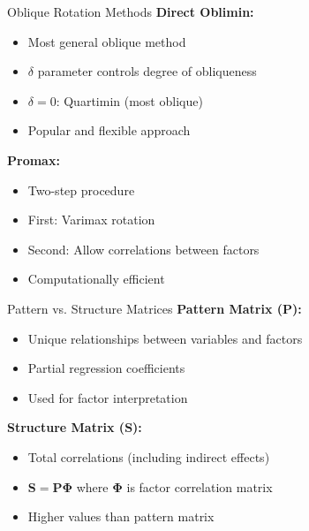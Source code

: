 \documentclass[aspectratio=169]{beamer}
\begin{document}
\begin{frame}{Oblique Rotation Methods}
  \textbf{Direct Oblimin:}
  \begin{itemize}
    \item Most general oblique method
    \item $\delta$ parameter controls degree of obliqueness
    \item $\delta = 0$: Quartimin (most oblique)
    \item Popular and flexible approach
  \end{itemize}
  
  \textbf{Promax:}
  \begin{itemize}
    \item Two-step procedure
    \item First: Varimax rotation
    \item Second: Allow correlations between factors
    \item Computationally efficient
  \end{itemize}
\end{frame}

\begin{frame}{Pattern vs. Structure Matrices}
  \textbf{Pattern Matrix ($\mathbf{P}$):}
  \begin{itemize}
    \item Unique relationships between variables and factors
    \item Partial regression coefficients
    \item Used for factor interpretation
  \end{itemize}
  
  \textbf{Structure Matrix ($\mathbf{S}$):}
  \begin{itemize}
    \item Total correlations (including indirect effects)
    \item $\mathbf{S} = \mathbf{P}\boldsymbol{\Phi}$ where $\boldsymbol{\Phi}$ is factor correlation matrix
    \item Higher values than pattern matrix
  \end{itemize}
\end{frame}
\end{document}
